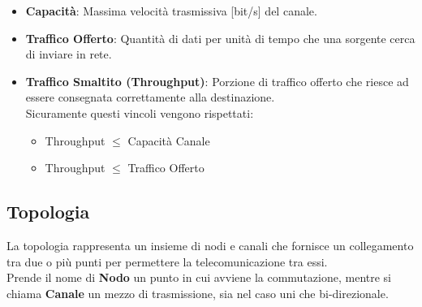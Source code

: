 \documentclass[12pt]{article}
\begin{document}
\begin{itemize}
  \item \textbf{Capacità}: Massima velocità trasmissiva [bit/s] del canale.\\
  \item \textbf{Traffico Offerto}: Quantità di dati per unità di tempo che una sorgente cerca di inviare in rete.\\
  \item \textbf{Traffico Smaltito (Throughput)}: Porzione di traffico offerto che riesce ad essere consegnata correttamente alla destinazione.\\
  Sicuramente questi vincoli vengono rispettati:
  \begin{itemize}
    \item Throughput $\leq$ Capacità Canale
    \item Throughput $\leq$ Traffico Offerto
  \end{itemize}
\end{itemize}
\subsection{Topologia}
La topologia rappresenta un insieme di nodi e canali che fornisce un collegamento tra due o più punti per permettere la telecomunicazione tra essi.\\
Prende il nome di \textbf{Nodo} un punto in cui avviene la commutazione, mentre si chiama \textbf{Canale} un mezzo di trasmissione, sia nel caso uni che bi-direzionale.
\end{document}
